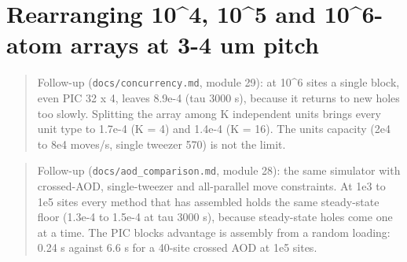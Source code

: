 \hypertarget{rearranging-104-105-and-106-atom-arrays-at-3-4-um-pitch}{%
\chapter{Rearranging 10\^{}\label{doc:megascale}4, 10\^{}5 and 10\^{}6-atom arrays at 3-4 um
pitch}\label{megascale-rearranging-104-105-and-106-atom-arrays-at-3-4-um-pitch}}

\begin{quote}
Follow-up (\texttt{docs/concurrency.md}, module 29): at 10\^{}6 sites a
single block, even PIC 32 x 4, leaves 8.9e-4 (tau 3000 s), because it
returns to new holes too slowly. Splitting the array among K independent
units brings every unit type to 1.7e-4 (K = 4) and 1.4e-4 (K = 16). The
units\textquotesingle{} capacity (2e4 to 8e4 moves/s, single tweezer
570) is not the limit.
\end{quote}

\begin{quote}
Follow-up (\texttt{docs/aod\_comparison.md}, module 28): the same
simulator with crossed-AOD, single-tweezer and all-parallel move
constraints. At 1e3 to 1e5 sites every method that has assembled holds
the same steady-state floor (1.3e-4 to 1.5e-4 at tau 3000 s), because
steady-state holes come one at a time. The PIC block\textquotesingle s
advantage is assembly from a random loading: 0.24 s against 6.6 s for a
40-site crossed AOD at 1e5 sites.
\end{quote}

